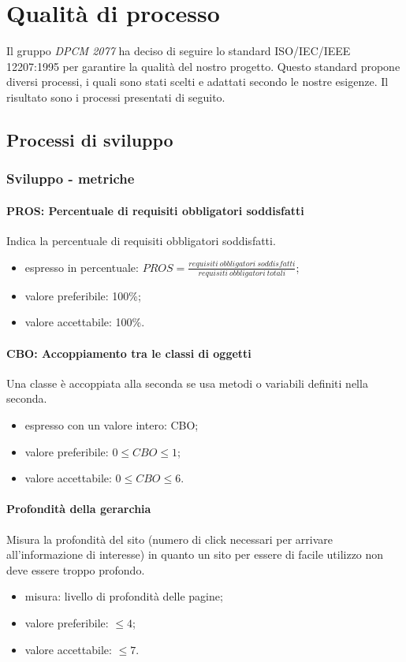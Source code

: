 \section{Qualità di processo}
Il gruppo \textit{DPCM 2077} ha deciso di seguire lo standard ISO/IEC/IEEE 12207:1995 per garantire la qualità del nostro progetto. Questo standard propone diversi processi, i quali sono stati scelti e adattati secondo le nostre esigenze. 
Il risultato sono i processi presentati di seguito.
	\subsection{Processi di sviluppo}
		\subsubsection{Sviluppo - metriche}
		\paragraph{PROS: Percentuale di requisiti obbligatori soddisfatti}
		Indica la percentuale di requisiti obbligatori soddisfatti.
		\begin{itemize}
		\item espresso in percentuale: $PROS = \frac{requisiti \ obbligatori \ soddisfatti}{requisiti \ obbligatori \ totali}$;
		\item valore preferibile: 100\%;
		\item valore accettabile: 100\%.
		\end{itemize}
		
		\paragraph{CBO: Accoppiamento tra le classi di oggetti}
		Una classe è accoppiata alla seconda se usa metodi o variabili definiti nella seconda.
		\begin{itemize}
		\item espresso con un valore intero: CBO;
		\item valore preferibile: $0 \leq CBO \leq 1$;
		\item valore accettabile: $0 \leq CBO \leq 6$.
		\end{itemize}
		
		\paragraph{Profondità della gerarchia}
		Misura la profondità del sito (numero di click necessari per arrivare all'informazione di interesse) in quanto un sito per essere di facile utilizzo non deve essere troppo profondo.
		\begin{itemize}
		\item misura: livello di profondità delle pagine;
		\item valore preferibile: $\leq 4$;
		\item valore accettabile: $ \leq 7$.
		\end{itemize}
		

